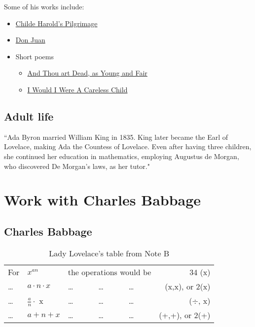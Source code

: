 \documentclass[a4paper, 12pt]{article}
\begin{document}
Some of his works include:

\begin{itemize}
\item \href{https://www.biblio.com/childe-harolds-pilgrimage-by-byron-lord/work/15593}{Childe Harold's Pilgrimage}
\item \href{https://www.biblio.com/don-juan-by-byron-lord/work/15592}{Don Juan}
\item Short poems
\begin{itemize}
\item \href{https://www.poetryfoundation.org/poems/43822/and-thou-art-dead-as-young-and-fair}{And Thou art Dead, as Young and Fair}
\item \href{https://englishhistory.net/byron/poems/careless-child/}{I Would I Were A Careless Child}
\end{itemize}
\end{itemize}

\subsection{Adult life}

``Ada Byron married William King in 1835. King later became the Earl of Lovelace, making Ada the Countess of Lovelace. Even after having three children, she continued her education in mathematics, employing Augustus de Morgan, who discovered De Morgan’s laws, as her tutor." \cite{twobit}

\section{Work with Charles Babbage}

\subsection{Charles Babbage}

\begin{table}[h]
\centering
\begin{tabular}{lllllr}
For & $x^{an}$ & \multicolumn{3}{c}{the operations would be} & 34 (x)\\
\ldots & $a \cdot n \cdot x$ & \ldots & \ldots & \ldots & (x,x), or 2(x) \\
\ldots & $\frac{a}{n} \cdot$ x & \ldots & \ldots & \ldots & ($\div$, x) \\
\ldots & $a + n + x$ & \ldots & \ldots & \ldots & (+,+), or 2(+) \\
\end{tabular}
\caption{Lady Lovelace's table from Note B \cite{ada}}
\label{noteg}
\end{table}
\end{document}
